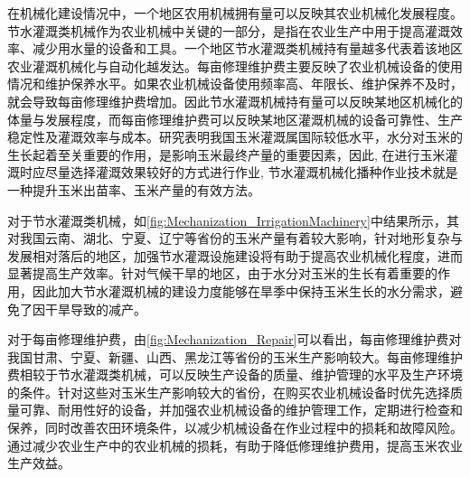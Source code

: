 在机械化建设情况中，一个地区农用机械拥有量可以反映其农业机械化发展程度。节水灌溉类机械作为农业机械中关键的一部分，是指在农业生产中用于提高灌溉效率、减少用水量的设备和工具。一个地区节水灌溉类机械持有量越多代表着该地区农业灌溉机械化与自动化越发达。每亩修理维护费主要反映了农业机械设备的使用情况和维护保养水平。如果农业机械设备使用频率高、年限长、维护保养不及时，就会导致每亩修理维护费增加。因此节水灌溉机械持有量可以反映某地区机械化的体量与发展程度，而每亩修理维护费可以反映某地区灌溉机械的设备可靠性、生产稳定性及灌溉效率与成本。研究表明我国玉米灌溉属国际较低水平，水分对玉米的生长起着至关重要的作用，是影响玉米最终产量的重要因素，因此, 在进行玉米灌溉时应尽量选择灌溉效果较好的方式进行作业, 节水灌溉机械化播种作业技术就是一种提升玉米出苗率、玉米产量的有效方法\cite{浅谈玉米节水灌溉机械化播种作业技术}。

对于节水灌溉类机械，如\ref{fig:Mechanization_IrrigationMachinery}中结果所示，其对我国云南、湖北、宁夏、辽宁等省份的玉米产量有着较大影响，针对地形复杂与发展相对落后的地区，加强节水灌溉设施建设将有助于提高农业机械化程度，进而显著提高生产效率。针对气候干旱的地区，由于水分对玉米的生长有着重要的作用，因此加大节水灌溉机械的建设力度能够在旱季中保持玉米生长的水分需求，避免了因干旱导致的减产。

对于每亩修理维护费，由\ref{fig:Mechanization_Repair}可以看出，每亩修理维护费对我国甘肃、宁夏、新疆、山西、黑龙江等省份的玉米生产影响较大。每亩修理维护费相较于节水灌溉类机械，可以反映生产设备的质量、维护管理的水平及生产环境的条件。针对这些对玉米生产影响较大的省份，在购买农业机械设备时优先选择质量可靠、耐用性好的设备，并加强农业机械设备的维护管理工作，定期进行检查和保养，同时改善农田环境条件，以减少机械设备在作业过程中的损耗和故障风险。通过减少农业生产中的农业机械的损耗，有助于降低修理维护费用，提高玉米农业生产效益。







